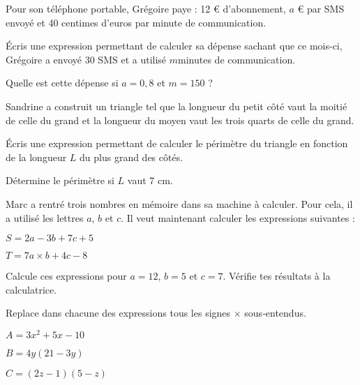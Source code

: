 \begin{exercice}
Pour son téléphone portable, Grégoire paye : 12 € d'abonnement, $a$ € par SMS envoyé et 40 centimes d'euros par minute de communication. 

\begin{colenumerate}{1} 
\item Écris une expression permettant de calculer sa dépense sachant que ce mois-ci, Grégoire a envoyé 30 SMS et a utilisé $m $minutes de communication.
\item Quelle est cette dépense si $a = 0,8$ et $m = 150$ ?
\end{colenumerate} 
\end{exercice}



\begin{exercice}
Sandrine a construit un triangle tel que la longueur du petit côté vaut la moitié de celle du grand et la longueur du moyen vaut les trois quarts de celle du grand.

\begin{colenumerate}{1} 
\item Écris une expression permettant de calculer le périmètre du triangle en fonction de la longueur $L$ du plus grand des côtés.
\item Détermine le périmètre si $L$ vaut 7 cm.
\end{colenumerate} 
\end{exercice}



\begin{exercice}
Marc a rentré trois nombres en mémoire dans sa machine à calculer. Pour cela, il a utilisé les lettres $a$, $b$ et $c$. Il veut maintenant calculer les expressions suivantes :

$S = 2a - 3b + 7c + 5$

$T = 7a \times b + 4c - 8$

Calcule ces expressions pour $a = 12$, $b = 5$ et $c = 7$. Vérifie tes résultats à la calculatrice.
\end{exercice}






\begin{exercice}
Replace dans chacune des expressions tous les signes $\times$ sous‑entendus.
\begin{colenumerate}{1}
\item $A = 3x^2 + 5x -10$
\item $B = 4y(21 -3y)$
\item $C = (2z -1)(5 -z)$
\end{colenumerate}
\end{exercice}

